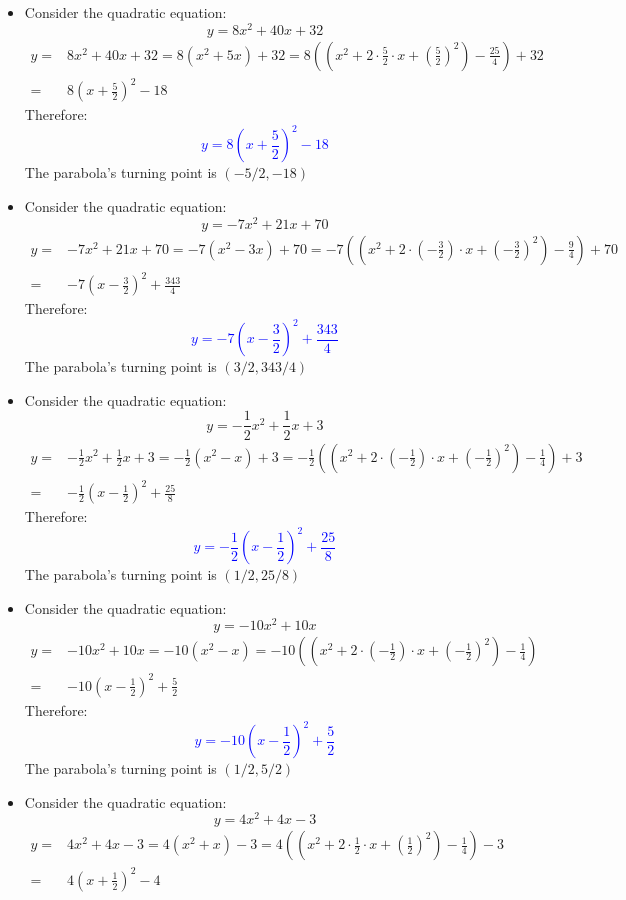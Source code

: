 \documentclass{article}
\newcommand{\dg}[1]{\textcolor{dark_green}{#1}}
\newcommand{\blue}[1]{\textcolor{blue}{#1}}
\begin{document}
\begin{itemize}
\item Consider the quadratic equation:
\dg{\[y = 8x^2 + 40x + 32\]}
\begin{align*}
y = & 8x^2 + 40x + 32 
= 8(x^2 + 5x) + 32 
= 8((x^2 + 2 \cdot \frac{5}{2} \cdot x + (\frac{5}{2})^2) - \frac{25}{4}) + 32 \\
= & 8(x + \frac{5}{2})^2 - 18
\end{align*}
Therefore:
\blue{\[y = 8(x + \frac{5}{2})^2 - 18\]}
The parabola's turning point is \((-5/2, -18)\)
\item Consider the quadratic equation:
\dg{\[y = -7x^2 + 21x + 70\]}
\begin{align*}
y = & -7x^2 + 21x + 70  
= -7(x^2 - 3x) + 70 
= -7((x^2 + 2 \cdot (-\frac{3}{2}) \cdot x + (-\frac{3}{2})^2) - \frac{9}{4}) + 70 \\
= & -7(x - \frac{3}{2})^2 + \frac{343}{4}
\end{align*}
Therefore:
\blue{\[y = -7(x - \frac{3}{2})^2 + \frac{343}{4}\]}
The parabola's turning point is \((3/2, 343/4)\)
\item Consider the quadratic equation:
\dg{\[y = -\frac{1}{2}x^2 + \frac{1}{2}x + 3\]}
\begin{align*}
y = & -\frac{1}{2}x^2 + \frac{1}{2}x + 3 
= -\frac{1}{2}(x^2 - x) + 3 
= -\frac{1}{2}((x^2 + 2 \cdot (-\frac{1}{2}) \cdot x + (-\frac{1}{2})^2) - \frac{1}{4}) + 3 \\
= & -\frac{1}{2}(x - \frac{1}{2})^2 + \frac{25}{8}
\end{align*}
Therefore:
\blue{\[y = -\frac{1}{2}(x - \frac{1}{2})^2 + \frac{25}{8}\]}
The parabola's turning point is \((1/2, 25/8)\)
\item Consider the quadratic equation:
\dg{\[y = -10x^2 + 10x\]}
\begin{align*}
y = & -10x^2 + 10x 
= -10(x^2 - x) 
= -10((x^2 + 2 \cdot (-\frac{1}{2}) \cdot x + (-\frac{1}{2})^2) - \frac{1}{4}) \\
= & -10(x - \frac{1}{2})^2 + \frac{5}{2}
\end{align*}
Therefore:
\blue{\[y = -10(x - \frac{1}{2})^2 + \frac{5}{2}\]}
The parabola's turning point is \((1/2, 5/2)\)
\item Consider the quadratic equation:
\dg{\[y = 4x^2 + 4x - 3\]}
\begin{align*}
y = & 4x^2 + 4x - 3 
= 4(x^2 + x) - 3 
= 4((x^2 + 2 \cdot \frac{1}{2} \cdot x + (\frac{1}{2})^2) - \frac{1}{4}) - 3 \\
= & 4(x + \frac{1}{2})^2 - 4

\end{align*}
\end{itemize}
\end{document}
